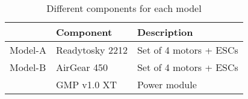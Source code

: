 \begin{table}[H]

\centering
    \caption{Different components for each model}
    \label{tab:comp_AB}
    
\begin{tabular}{lll}
\hline
\rowcolor[HTML]{FFFFFF} 
\multicolumn{1}{|l|}{\cellcolor[HTML]{FFFFFF}Category} & \multicolumn{1}{l|}{\cellcolor[HTML]{FFFFFF}Component} & \multicolumn{1}{l|}{\cellcolor[HTML]{FFFFFF}Description} \\ \hline
\rowcolor[HTML]{9AFF99} 
Model-A                                                   & Readytosky 2212                                           & Set of 4 motors + ESCs                                                                                                        \\
\rowcolor[HTML]{FFFC9E} 
Model-B                                                   & AirGear 450                                            & Set of 4 motors + ESCs                                                                                                       \\
\rowcolor[HTML]{FFFC9E} 
                                                    & GMP v1.0 XT                                            & Power module                                                                                                        
\end{tabular}
\end{table}